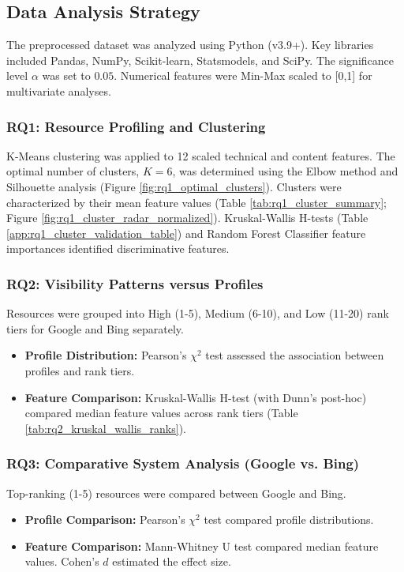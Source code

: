 \documentclass[a4paper,fleqn]{cas-sc}
\begin{document}
\subsection{Data Analysis Strategy}
\label{subsec:analysis_strategy}
The preprocessed dataset was analyzed using Python (v3.9+). Key libraries included Pandas, NumPy, Scikit-learn, Statsmodels, and SciPy. The significance level $\alpha$ was set to $0.05$. Numerical features were Min-Max scaled to [0,1] for multivariate analyses.

\subsubsection{RQ1: Resource Profiling and Clustering}
\label{subsubsec:analysis_rq1}
K-Means clustering was applied to 12 scaled technical and content features. The optimal number of clusters, $K=6$, was determined using the Elbow method and Silhouette analysis (Figure \ref{fig:rq1_optimal_clusters}). Clusters were characterized by their mean feature values (Table \ref{tab:rq1_cluster_summary}; Figure \ref{fig:rq1_cluster_radar_normalized}). Kruskal-Wallis H-tests (Table \ref{app:rq1_cluster_validation_table}) and Random Forest Classifier feature importances identified discriminative features.

\subsubsection{RQ2: Visibility Patterns versus Profiles}
\label{subsubsec:analysis_rq2}
Resources were grouped into High (1-5), Medium (6-10), and Low (11-20) rank tiers for Google and Bing separately.
\begin{itemize}
    \item \textbf{Profile Distribution:} Pearson's $\chi^2$ test assessed the association between profiles and rank tiers.
    \item \textbf{Feature Comparison:} Kruskal-Wallis H-test (with Dunn's post-hoc) compared median feature values across rank tiers (Table \ref{tab:rq2_kruskal_wallis_ranks}).
\end{itemize}

\subsubsection{RQ3: Comparative System Analysis (Google vs. Bing)}
\label{subsubsec:analysis_rq3}
Top-ranking (1-5) resources were compared between Google and Bing.
\begin{itemize}
    \item \textbf{Profile Comparison:} Pearson's $\chi^2$ test compared profile distributions.
    \item \textbf{Feature Comparison:} Mann-Whitney U test compared median feature values. Cohen's $d$ estimated the effect size.
\end{itemize}
\end{document}
